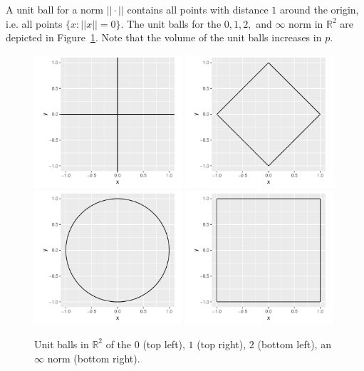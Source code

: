 \documentclass[12pt, twoside]{article}
\newcommand{\R}{\mathbb{R}}
\newcommand{\1}{\mathbb{1}}
\begin{document}
A unit ball for a norm $||\cdot||$ contains all points with distance $1$ around the origin, i.e. all points $\{x: ||x|| = 0\}$. The unit balls for the $0, 1, 2,$ and $\infty$ norm in $\R^2$ are depicted in Figure~\ref{fig:input}. Note that the volume of the unit balls increases in $p$.
\begin{figure}[ht]
    \centering
    \includegraphics[width=0.49\textwidth]{plots/unit_circle_0.pdf}
    \includegraphics[width=0.49\textwidth]{plots/unit_circle_1.pdf}
    \includegraphics[width=0.49\textwidth]{plots/unit_circle_2.pdf}
    \includegraphics[width=0.49\textwidth]{plots/unit_circle_inf.pdf}
    \caption{Unit balls in $\R^2$ of the $0$ (top left), $1$ (top right), $2$ (bottom left), an $\infty$ norm (bottom right).}
    \label{fig:input}
\end{figure}
\end{document}
